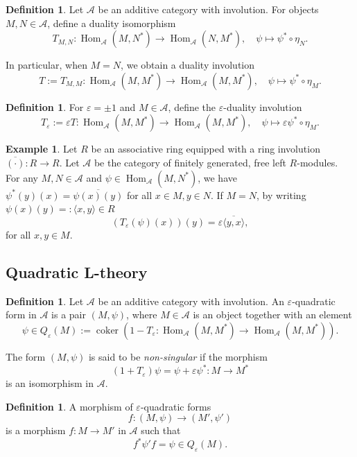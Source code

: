 \documentclass{article}
\theoremstyle{definition}
\newtheorem{defn}[theorem]{Definition}
\newtheorem{exmp}[theorem]{Example}
\newcommand{\CA}{{ \mathcal A}}
\begin{document}
\begin{defn}
    

Let \( \mathcal{A} \) be an additive category with involution. For objects \( M, N \in \mathcal{A} \), define a duality isomorphism
\[
T_{M,N} : \operatorname{Hom}_{\mathcal{A}}(M, N^*) \to \operatorname{Hom}_{\mathcal{A}}(N, M^*), \quad \psi \mapsto \psi^*\circ \eta_N.
\]

In particular, when \( M = N \), we obtain a duality involution
\[
T := T_{M,M} : \operatorname{Hom}_{\mathcal{A}}(M, M^*) \to \operatorname{Hom}_{\mathcal{A}}(M, M^*), \quad \psi \mapsto \psi^*\circ \eta_M.
\]
\end{defn}
\begin{defn}

For \( \varepsilon = \pm 1 \) and \( M \in \mathcal{A} \), define the \( \varepsilon \)-duality involution
\[
T_\varepsilon := \varepsilon T : \operatorname{Hom}_{\mathcal{A}}(M, M^*) \to \operatorname{Hom}_{\mathcal{A}}(M, M^*), \quad \psi \mapsto \varepsilon \psi^*\circ \eta_M.
\]

\end{defn}

\begin{exmp}
    Let $R$ be an associative ring equipped with a ring involution $\overline{(\cdot)}: R\rightarrow R$. Let $\CA$ be the category of finitely generated, free left $R$-modules. For any $M, N\in \CA$ and $\psi \in \operatorname{Hom}_{\mathcal{A}}(M, N^*)$, we have $\psi^*(y)(x)=\overline{\psi(x)(y)}$ for all $x\in M, y\in N.$ If $M=N$, 
 by writing $\psi(x)(y)=:\langle x, y\rangle\in R$
$$(T_\varepsilon(\psi)(x))(y)= \varepsilon \overline{\langle y, x\rangle},$$ for all $x, y\in M.$

\end{exmp}

\subsection{Quadratic L-theory}
\begin{defn}
    
Let \( \mathcal{A} \) be an additive category with involution. An \( \varepsilon \)-quadratic form in \( \mathcal{A} \) is a pair \( (M, \psi) \), where \( M \in \mathcal{A} \) is an object together with an element
\[
\psi \in Q_\varepsilon(M) := \operatorname{coker}(1 - T_\varepsilon : \operatorname{Hom}_{\mathcal{A}}(M, M^*) \to \operatorname{Hom}_{\mathcal{A}}(M, M^*)).
\]

The form \( (M, \psi) \) is said to be \emph{non-singular} if the morphism
\[
(1 + T_\varepsilon)\psi = \psi + \varepsilon \psi^* : M \to M^*
\]
is an isomorphism in \( \mathcal{A} \).
\end{defn} 
\begin{defn}
    
A morphism of \( \varepsilon \)-quadratic forms
\[
f : (M, \psi) \to (M', \psi')
\]
is a morphism \( f : M \to M' \) in \( \mathcal{A} \) such that
\[
f^* \psi' f = \psi \in Q_\varepsilon(M).
\]

\end{defn} 
\end{document}
